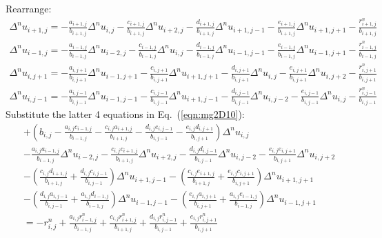 \documentclass{warpdoc}
\begin{document}
Rearrange:
%
\begin{align}
   \Delta^n u_{i+1,j} 
=-   \frac{a_{i+1,j}}{b_{i+1,j}} \Delta^n u_{i,j} 
-  \frac{c_{i+1,j}}{b_{i+1,j}} \Delta^n u_{i+2,j} 
-  \frac{d_{i+1,j}}{b_{i+1,j}} \Delta^n u_{i+1,j-1} 
-  \frac{e_{i+1,j}}{b_{i+1,j}} \Delta^n u_{i+1,j+1} 
 -\frac{r_{i+1,j}^n}{b_{i+1,j}}
\label{eqn:mg2D6}
\end{align}
%
%
\begin{align}
   \Delta^n u_{i-1,j} 
= - \frac{a_{i-1,j}}{b_{i-1,j}} \Delta^n u_{i-2,j} 
-  \frac{c_{i-1,j}}{b_{i-1,j}} \Delta^n u_{i,j} 
-  \frac{d_{i-1,j}}{b_{i-1,j}} \Delta^n u_{i-1,j-1} 
-  \frac{e_{i-1,j}}{b_{i-1,j}} \Delta^n u_{i-1,j+1} 
-  \frac{r_{i-1,j}^n}{b_{i-1,j}}
\label{eqn:mg2D7}
\end{align}
%
%
\begin{align}
   \Delta^n u_{i,j+1} 
=
-   \frac{a_{i,j+1}}{b_{i,j+1}} \Delta^n u_{i-1,j+1} 
-  \frac{c_{i,j+1}}{b_{i,j+1}} \Delta^n u_{i+1,j+1} 
-  \frac{d_{i,j+1}}{b_{i,j+1}} \Delta^n u_{i,j} 
-  \frac{e_{i,j+1}}{b_{i,j+1}} \Delta^n u_{i,j+2} 
-  \frac{r_{i,j+1}^n}{b_{i,j+1}}
\label{eqn:mg2D8}
\end{align}
%
%
\begin{align}
   \Delta^n u_{i,j-1} 
=
-  \frac{a_{i,j-1}}{b_{i,j-1}} \Delta^n u_{i-1,j-1} 
-  \frac{c_{i,j-1}}{b_{i,j-1}} \Delta^n u_{i+1,j-1} 
-  \frac{d_{i,j-1}}{b_{i,j-1}} \Delta^n u_{i,j-2} 
-  \frac{e_{i,j-1}}{b_{i,j-1}} \Delta^n u_{i,j} 
-  \frac{r_{i,j-1}^n}{b_{i,j-1}}
\label{eqn:mg2D9}
\end{align}
%
Substitute the latter 4 equations in Eq.\ (\ref{eqn:mg2D10}):
%
\begin{align}
+ \left( b_{i,j} -  \frac{a_{i,j} c_{i-1,j}}{b_{i-1,j}} -   \frac{c_{i,j} a_{i+1,j}}{b_{i+1,j}} 
        -  \frac{d_{i,j} e_{i,j-1}}{b_{i,j-1}} -  \frac{e_{i,j} d_{i,j+1}}{b_{i,j+1}} \right) \Delta^n u_{i,j} 
 \nonumber\\
- \frac{a_{i,j} a_{i-1,j}}{b_{i-1,j}} \Delta^n u_{i-2,j} 
-  \frac{c_{i,j} c_{i+1,j}}{b_{i+1,j}} \Delta^n u_{i+2,j} 
-  \frac{d_{i,j} d_{i,j-1}}{b_{i,j-1}} \Delta^n u_{i,j-2} 
-  \frac{e_{i,j} e_{i,j+1}}{b_{i,j+1}} \Delta^n u_{i,j+2} 
\nonumber\\
-  \left(\frac{c_{i,j} d_{i+1,j}}{b_{i+1,j}}+\frac{d_{i,j} c_{i,j-1}}{b_{i,j-1}}\right) \Delta^n u_{i+1,j-1} 
-  \left(\frac{c_{i,j} e_{i+1,j}}{b_{i+1,j}}+\frac{e_{i,j} c_{i,j+1}}{b_{i,j+1}} \right)\Delta^n u_{i+1,j+1} 
\nonumber\\
-  \left(\frac{d_{i,j} a_{i,j-1}}{b_{i,j-1}}+\frac{a_{i,j} d_{i-1,j}}{b_{i-1,j}}\right) \Delta^n u_{i-1,j-1} 
-   \left(\frac{e_{i,j} a_{i,j+1}}{b_{i,j+1}}+\frac{a_{i,j} e_{i-1,j}}{b_{i-1,j}}\right) \Delta^n u_{i-1,j+1} 
\nonumber\\
= -r_{i,j}^n
+  \frac{a_{i,j} r_{i-1,j}^n}{b_{i-1,j}}
+  \frac{c_{i,j} r_{i+1,j}^n}{b_{i+1,j}}
+  \frac{d_{i,j} r_{i,j-1}^n}{b_{i,j-1}}
+  \frac{e_{i,j} r_{i,j+1}^n}{b_{i,j+1}}
\label{eqn:mg2D10}
\end{align}
%



  
  
\end{document}
